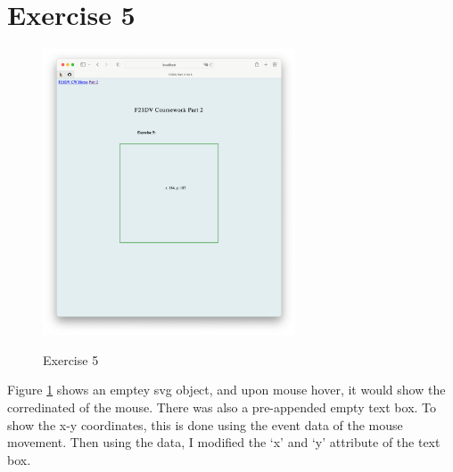 \documentclass{scrreprt}
\begin{document}
\newpage
\section{Exercise 5}
\begin{figure}[!ht]
    \centering
    \includegraphics[width = 7.5cm]{images/ex5.png}
    \label{fig:ex5}
    \caption{Exercise 5}
\end{figure}
\FloatBarrier
% 
Figure \ref{fig:ex5} shows an emptey svg object, and upon mouse hover, it would show the corredinated of the mouse. There was also a pre-appended empty text box. To show the x-y coordinates, this is done using the event data of the mouse movement. Then using the data, I modified the `x' and `y' attribute of the text box.

\newpage
\end{document}
